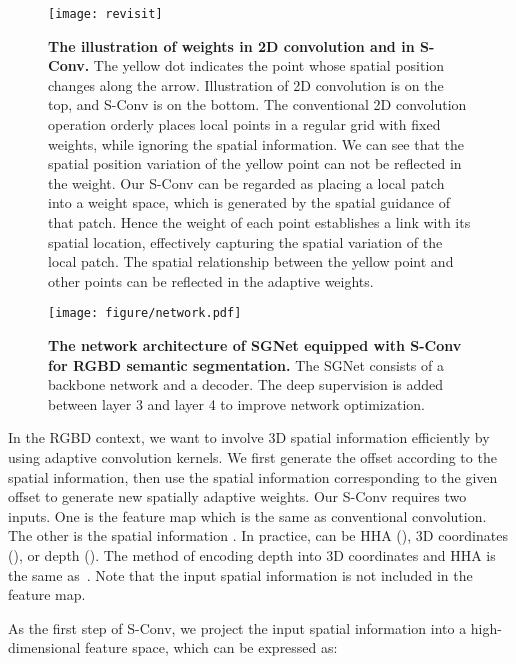 \documentclass[journal]{IEEEtran}
\begin{document}
\begin{figure}[t]
	\centering
	\vspace{-30pt}
	\texttt{[image: revisit]}
	\vspace{-30pt}
	\caption{
\textbf{The illustration of weights  in 2D convolution and  in S-Conv.}
The yellow dot indicates the point whose spatial position changes along the arrow.
		Illustration of 2D convolution is on the top, and S-Conv is on the bottom.
The conventional 2D convolution operation orderly places local
		points in a regular grid with fixed weights, while ignoring the spatial information.
		We can see that the spatial position variation of the yellow point 
		can not be reflected in the weight.
		Our S-Conv can be regarded as placing a local patch
		into a weight space, which is generated by the spatial guidance of that patch.
		Hence the weight of each point establishes a link with its spatial location,
		effectively capturing the spatial variation of the local patch.
		The spatial relationship between the yellow point and other points
		can be reflected in the adaptive weights.}
	\label{fig:revisit}
\end{figure}
\begin{figure*}[t]
	\centering
	\texttt{[image: figure/network.pdf]}
	\vspace{-20pt}
	\caption{\textbf{The network architecture of SGNet equipped with S-Conv for 
	RGBD semantic segmentation.} 
	The SGNet consists
		of a backbone network and a decoder. 
		The deep supervision is added between layer 3 and layer 4 to 
		improve network optimization.}
	\label{fig:network}
\end{figure*}
In the RGBD context, we want to involve 3D spatial
information efficiently by using adaptive convolution kernels.
We first generate the offset according to the spatial
information, then use the spatial
information corresponding to the given offset
to generate new spatially adaptive weights.
Our S-Conv requires two inputs. One is the feature map 
which is the same as conventional convolution.
The other is the spatial information .
In practice,  can be HHA (), 3D coordinates (), or depth ().
The method of encoding depth into 3D coordinates and HHA is the same as~\cite{qi20173d}.
Note that the input spatial information is not included in the feature map.


As the first step of S-Conv, we project the input spatial information into
a high-dimensional feature space, which can be expressed as:
\end{document}
